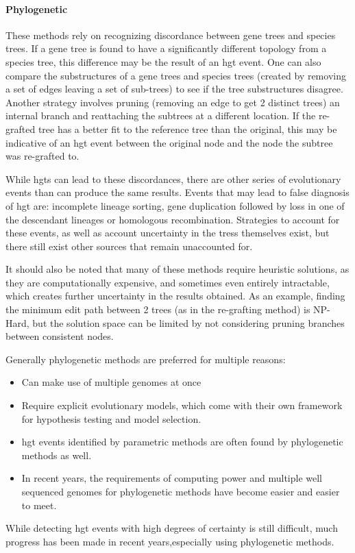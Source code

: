 \paragraph{Phylogenetic}
These methods rely on recognizing discordance between gene trees and species trees.
If a gene tree is found to have a significantly different topology from a species tree, this difference may be the result of an \ac{hgt} event\citep{hgterr}.
One can also compare the substructures of a gene trees and species trees (created by removing a set of edges leaving a set of sub-trees) to see if the tree substructures disagree\citep{ihgt}.
Another strategy involves pruning (removing an edge to get 2 distinct trees) an internal branch and reattaching the subtrees at a different location.
If the re-grafted tree has a better fit to the reference tree than the original, this may be indicative of an \ac{hgt} event between the original node and the node the subtree was re-grafted to\citep{ihgt}.\par
While \ac{hgt}s can lead to these discordances, there are other series of evolutionary events than can produce the same results\citep{hgterr}.
Events that may lead to false diagnosis of \ac{hgt} are: incomplete lineage sorting, gene duplication followed by loss in one of the descendant lineages or homologous recombination\citep{ihgt,hgterr}.
Strategies to account for these events, as well as account uncertainty in the tress themselves exist, but there still exist other sources that remain unaccounted for\citep{hgterr}.\par
It should also be noted that many of these methods require heuristic solutions, as they are computationally expensive, and sometimes even entirely intractable, which creates further uncertainty in the results obtained\citep{ihgt}.
As an example, finding the minimum edit path between 2 trees (as in the re-grafting method) is NP-Hard, but the solution space can be limited by not considering pruning branches between consistent nodes\citep{sprnp,ihgt}.\par\par
Generally phylogenetic methods are preferred for multiple reasons:
\begin{itemize}
    \item Can make use of multiple genomes at once\citep{ihgt}
    \item Require explicit evolutionary models, which come with their own framework for hypothesis testing and model selection\citep{ihgt}.
    \item \ac{hgt} events identified by parametric methods are often found by phylogenetic methods as well\citep{ihgt}.
    \item In recent years, the requirements of computing power and  multiple well sequenced genomes for phylogenetic methods have become easier and easier to meet\citep{ihgt}.
\end{itemize}
While detecting \ac{hgt} events with high degrees of certainty is still difficult, much progress has been made in recent years,especially using phylogenetic methods\citep{ihgt}.
